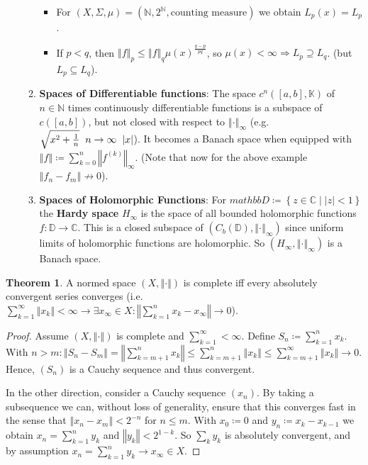 \documentclass[10pt,a4paper]{article}
\theoremstyle{definition}
\theoremstyle{cor}
\theoremstyle{theorem}
\newtheorem{theorem}{Theorem}
\theoremstyle{lemma}
\theoremstyle{example}
\theoremstyle{remark}
\newcommand{\norm}[1]{\left\Vert #1 \right\Vert}
\begin{document}
\begin{itemize}
\begin{enumerate}[(1)]
\begin{itemize}
\item  For $(X, \Sigma, \mu) = \left(\mathbb{N}, 2^{\mathbb{N}}, \text{counting measure} \right)$ we obtain $L_p(x) = L_p$.
\item If $p<q$, then $\norm{f}_p \leq \norm{f}_q \mu(x)^{\frac{q - p}{pq}}$, so $\mu(x) < \infty \Rightarrow L_p \supseteq L_q$. (but $L_p \subseteq L_q$).
\end{itemize}
\item \textbf{Spaces of Differentiable functions}: The space $c^{n}([a , b], \mathbb{K})$ of $n \in \mathbb{N}$ times continuously differentiable functions is a subspace of $c([a, b])$, but not closed with respect to $\norm{\cdot}_{\infty}$ (e.g. $\sqrt{x^2 + \frac{1}{n}} \hspace{2mm}n \to \infty \hspace{2mm} |x|$). It becomes a Banach space when equipped with $\norm{f} \coloneqq \sum_{k = 0}^{n} \norm{f^{(k)}}_{\infty}$. (Note that now for the above example $\norm{f_n - f_m} \not\to 0$).
\item \textbf{Spaces of Holomorphic Functions}: For $mathbb{D} \coloneqq \left\{ z \in \mathbb{C} \mid |z| < 1\right\}$ the \textbf{Hardy space} $H_{\infty}$ is the space of all bounded holomorphic functions $f: \mathbb{D}\to\mathbb{C}$. This is a closed subspace of $(C_b(\mathbb{D}), \norm{\cdot}_{\infty})$ since uniform limits of holomorphic functions are holomorphic. So $(H_{\infty}, \norm{\cdot}_{\infty})$ is a Banach space.
\end{enumerate}
\end{itemize}

\begin{theorem}
A normed space $(X, \norm{\cdot})$ is complete iff every absolutely convergent series converges (i.e. $\sum_{k = 1}^{\infty} \norm{x_k} < \infty \rightarrow \exists x_{\infty} \in X : \norm{\sum_{k=1}^{n} x_k - x_{\infty}} \to 0$).
\end{theorem}
\begin{proof}
Assume $(X, \norm{\cdot})$ is complete and $\sum_{k=1}^{\infty} < \infty$. Define $S_n \coloneqq \sum_{k=1}^{n} x_k$. With $n>m: \norm{S_n -S_m} = \norm{\sum_{k=m+1}^{n} x_k} \leq \sum_{k=m+1}^{n} \norm{x_k} \leq \sum_{k=m+1}^{\infty} \norm{x_k} \to 0$. Hence, $(S_n)$ is a Cauchy sequence and thus convergent. 

In the other direction, consider a Cauchy sequence $(x_n)$. By taking a subsequence we can, without loss of generality, ensure that this converges fast in the sense that $\norm{x_n - x_m} < 2^{-n}$ for $n\leq m$. With $x_0 \coloneqq 0$ and $y_n \coloneqq x_k - x_{k-1}$ we obtain $x_n = \sum_{k=1}^{n} y_k$ and $\norm{y_k} < 2^{1 - k}$. So $\sum_{k} y_{k}$ is absolutely convergent, and by assumption $x_n = \sum_{k = 1}^{n} y_k \to x_{\infty} \in X$.
\end{proof}
\end{document}

